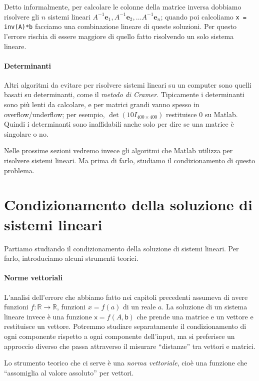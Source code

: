 \documentclass[a4paper]{report}
\theoremstyle{definiton}
\theoremstyle{remark}
\begin{document}
Detto informalmente, per calcolare le colonne della matrice inversa dobbiamo risolvere gli $n$ sistemi lineari $A^{-1}\mathbf{e}_1, A^{-1}\mathbf{e}_2,\dots A^{-1}\mathbf{e}_n$; quando poi calcoliamo \texttt{x = inv(A)*b} facciamo una combinazione lineare di queste soluzioni. Per questo l'errore rischia di essere maggiore di quello fatto risolvendo un solo sistema lineare.

\paragraph{Determinanti} Altri algoritmi da evitare per risolvere sistemi lineari su un computer sono quelli basati su determinanti, come il \emph{metodo di Cramer}. Tipicamente i determinanti sono più lenti da calcolare, e per matrici grandi vanno spesso in overflow/underflow; per esempio, $\det(10 I_{400\times 400})$ restituisce $0$ su Matlab. Quindi i determinanti sono inaffidabili anche solo per dire se una matrice è singolare o no. 

Nelle prossime sezioni vedremo invece gli algoritmi che Matlab utilizza per risolvere sistemi lineari. Ma prima di farlo, studiamo il condizionamento di questo problema.

\section{Condizionamento della soluzione di sistemi lineari}

Partiamo studiando il condizionamento della soluzione di sistemi lineari. Per farlo, introduciamo alcuni strumenti teorici.

\paragraph{Norme vettoriali} L'analisi dell'errore che abbiamo fatto nei capitoli precedenti assumeva di avere funzioni $f: \mathbb{R} \to \mathbb{R}$, funzioni $x=f(a)$ di un reale $a$. La soluzione di un sistema lineare invece è una funzione $\mathsf{x} = f(A,\mathsf{b})$ che prende una matrice e un vettore e restituisce un vettore. Potremmo studiare separatamente il condizionamento di ogni componente rispetto a ogni componente dell'input, ma si preferisce un approccio diverso che passa attraverso il misurare ``distanze'' tra vettori e matrici.

Lo strumento teorico che ci serve è una \emph{norma vettoriale}, cioè una funzione che ``assomiglia al valore assoluto'' per vettori.
\end{document}

